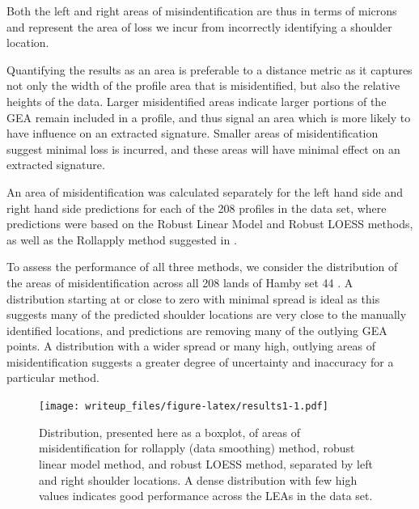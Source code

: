 \documentclass[12pt]{article}
\begin{document}
Both the left and right areas of misindentification are thus in terms of
microns and represent the area of loss we incur from incorrectly
identifying a shoulder location.

Quantifying the results as an area is preferable to a distance metric as
it captures not only the width of the profile area that is
misidentified, but also the relative heights of the data. Larger
misidentified areas indicate larger portions of the GEA remain included
in a profile, and thus signal an area which is more likely to have
influence on an extracted signature. Smaller areas of misidentification
suggest minimal loss is incurred, and these areas will have minimal
effect on an extracted signature.

An area of misidentification was calculated separately for the left hand
side and right hand side predictions for each of the 208
{\color{teal}{+414}} profiles in the data set, where predictions were
based on the Robust Linear Model and Robust LOESS methods, as well as
the Rollapply method suggested in \citet{Hare1}.

To assess the performance of all three methods, we consider the
distribution of the areas of misidentification across all 208
{\color{teal}{+414}} lands of Hamby set 44
{\color{teal}{and Houston-test}}.
{}
A distribution starting at or close to zero with minimal spread is ideal
as this suggests many of the predicted shoulder locations are very close
to the manually identified locations, and predictions are removing many
of the outlying GEA points. A distribution with a wider spread or many
high, outlying areas of misidentification suggests a greater degree of
uncertainty and inaccuracy for a particular method.
{\color{teal}{Some of the outliers are so extreme, statistics appear very close to one another or on top of each other.}}

\begin{figure}
\centering
\texttt{[image: writeup\_files/figure-latex/results1-1.pdf]}
\caption{\label{results1}Distribution, presented here as a boxplot, of
areas of misidentification for rollapply (data smoothing) method, robust
linear model method, and robust LOESS method, separated by left and
right shoulder locations. A dense distribution with few high values
indicates good performance across the LEAs in the data set.}
\end{figure}
\end{document}
